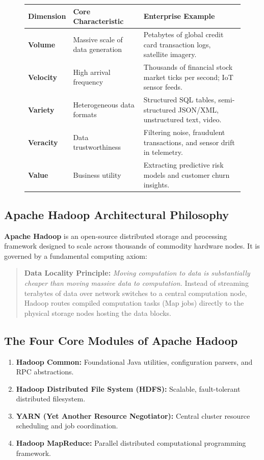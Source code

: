 \begin{figure}[htbp]
\centering
\small
\begin{tabularx}{\textwidth}{l p{2.8cm} X}
\toprule
\textbf{Dimension} & \textbf{Core Characteristic} & \textbf{Enterprise Example} \\
\midrule
\textbf{Volume} & Massive scale of data generation & Petabytes of global credit card transaction logs, satellite imagery. \\
\textbf{Velocity} & High arrival frequency & Thousands of financial stock market ticks per second; IoT sensor feeds. \\
\textbf{Variety} & Heterogeneous data formats & Structured SQL tables, semi-structured JSON/XML, unstructured text, video. \\
\textbf{Veracity} & Data trustworthiness & Filtering noise, fraudulent transactions, and sensor drift in telemetry. \\
\textbf{Value} & Business utility & Extracting predictive risk models and customer churn insights. \\
\bottomrule
\end{tabularx}
\end{figure}

\subsection{Apache Hadoop Architectural Philosophy}
\textbf{Apache Hadoop} is an open-source distributed storage and processing framework designed to scale across thousands of commodity hardware nodes. It is governed by a fundamental computing axiom:
\begin{quote}
\textbf{Data Locality Principle:} \textit{Moving computation to data is substantially cheaper than moving massive data to computation.} Instead of streaming terabytes of data over network switches to a central computation node, Hadoop routes compiled computation tasks (Map jobs) directly to the physical storage nodes hosting the data blocks.
\end{quote}

\subsection{The Four Core Modules of Apache Hadoop}
\begin{enumerate}
    \item \textbf{Hadoop Common:} Foundational Java utilities, configuration parsers, and RPC abstractions.
    \item \textbf{Hadoop Distributed File System (HDFS):} Scalable, fault-tolerant distributed filesystem.
    \item \textbf{YARN (Yet Another Resource Negotiator):} Central cluster resource scheduling and job coordination.
    \item \textbf{Hadoop MapReduce:} Parallel distributed computational programming framework.
\end{enumerate}

